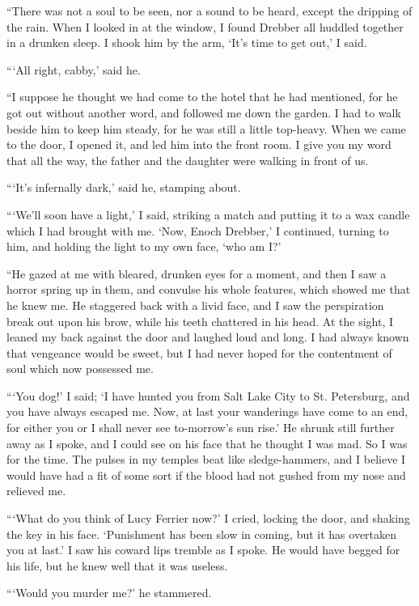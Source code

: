 \documentclass[12pt]{book}
\begin{document}
“There was not a soul to be seen, nor a sound to be heard, except the dripping of the rain. When I looked in at the window, I found Drebber all huddled together in a drunken sleep. I shook him by the arm, ‘It’s time to get out,’ I said. 

“‘All right, cabby,’ said he. 

“I suppose he thought we had come to the hotel that he had mentioned, for he got out without another word, and followed me down the garden. I had to walk beside him to keep him steady, for he was still a little top-heavy. When we came to the door, I opened it, and led him into the front room. I give you my word that all the way, the father and the daughter were walking in front of us. 

“‘It’s infernally dark,’ said he, stamping about. 

“‘We’ll soon have a light,’ I said, striking a match and putting it to a wax candle which I had brought with me. ‘Now, Enoch Drebber,’ I continued, turning to him, and holding the light to my own face, ‘who am I?’ 

“He gazed at me with bleared, drunken eyes for a moment, and then I saw a horror spring up in them, and convulse his whole features, which showed me that he knew me. He staggered back with a livid face, and I saw the perspiration break out upon his brow, while his teeth chattered in his head. At the sight, I leaned my back against the door and laughed loud and long. I had always known that vengeance would be sweet, but I had never hoped for the contentment of soul which now possessed me. 

“‘You dog!’ I said; ‘I have hunted you from Salt Lake City to St. Petersburg, and you have always escaped me. Now, at last your wanderings have come to an end, for either you or I shall never see to-morrow’s sun rise.’ He shrunk still further away as I spoke, and I could see on his face that he thought I was mad. So I was for the time. The pulses in my temples beat like sledge-hammers, and I believe I would have had a fit of some sort if the blood had not gushed from my nose and relieved me. 

“‘What do you think of Lucy Ferrier now?’ I cried, locking the door, and shaking the key in his face. ‘Punishment has been slow in coming, but it has overtaken you at last.’ I saw his coward lips tremble as I spoke. He would have begged for his life, but he knew well that it was useless. 

“‘Would you murder me?’ he stammered. 
\end{document}
